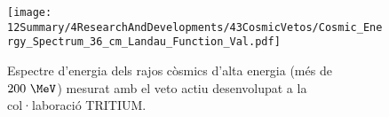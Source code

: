 \begin{enumerate}
\begin{figure}[h]
\texttt{[image: 12Summary/4ResearchAndDevelopments/43CosmicVetos/Cosmic\_Energy\_Spectrum\_36\_cm\_Landau\_Function\_Val.pdf]}
\centering
\caption{Espectre d'energia dels rajos còsmics d'alta energia (més de $200~\MeV$) mesurat amb el veto actiu desenvolupat a la col·laboració TRITIUM\label{fig:EspectreEnergeticVetoActiu}.}
\end{figure}

\end{enumerate} 